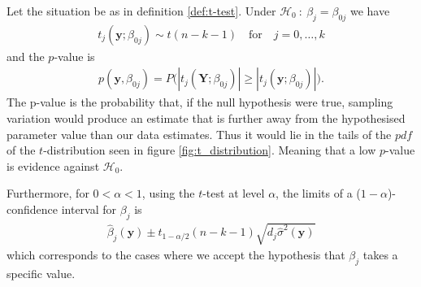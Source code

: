 \begin{theorem}  \label{th:t_distribution}
Let the situation be as in definition \ref{def:t-test}. Under $\mathcal{H}_0 \ : \ \beta_j=\beta_{0j}$ we have 
\begin{align}
   t_j(\textbf{y};\beta_{0j})  \sim t(n-k-1) \quad \text{for} \quad j=0,\ldots,k
\end{align}
and the $p$-value is
\begin{align}\label{eq:t_test_pvalue}
    p(\textbf{y},\beta_{0j})=P\Big(|t_j(\textbf{Y};\beta_{0j})|\geq |t_j(\textbf{y};\beta_{0j})|\Big).
\end{align}
The p-value is the probability that, if the null hypothesis were true, sampling variation would produce an estimate that is further away from the hypothesised parameter value than our data estimates.  
Thus it would lie in the tails of the $pdf$ of the $t$-distribution seen in figure \ref{fig:t_distribution}.
Meaning that a low $p$-value is evidence against $\mathcal{H}_0$.

Furthermore, for $0<\alpha<1$, using the $t$-test at level $\alpha$, the limits of a ($1-\alpha$)-confidence interval for $\beta_j$ is
\begin{align} \label{eq:t_statistic}
    \hat{\beta}_{j}(\textbf{y}) \pm t_{1-\alpha/2}(n-k-1)\sqrt{d_j\hat{\sigma}^2(\textbf{y})}
\end{align}
which corresponds to the cases where we accept the hypothesis that $\beta_j$ takes a specific value.
\end{theorem}

